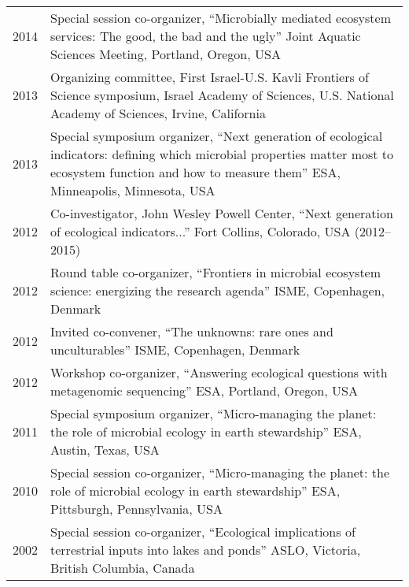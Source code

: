 \documentclass[11pt]{article}
\begin{document}
\begin{longtable}{@{}p{3em}@{\hspace{1.5em}}p{}@{}}
2014 & Special session co-organizer, “Microbially mediated ecosystem services: The good, the bad and the ugly” Joint Aquatic Sciences Meeting, Portland, Oregon, USA \\
2013 & Organizing committee, First Israel-U.S. Kavli Frontiers of Science symposium, Israel Academy of Sciences, U.S. National Academy of Sciences, Irvine, California \\
2013 & Special symposium organizer, “Next generation of ecological indicators: defining which microbial properties matter most to ecosystem function and how to measure them” ESA, Minneapolis, Minnesota, USA \\
2012 & Co-investigator, John Wesley Powell Center, “Next generation of ecological indicators...” Fort Collins, Colorado, USA (2012--2015) \\
2012 & Round table co-organizer, “Frontiers in microbial ecosystem science: energizing the research agenda” ISME, Copenhagen, Denmark \\
2012 & Invited co-convener, “The unknowns: rare ones and unculturables” ISME, Copenhagen, Denmark \\
2012 & Workshop co-organizer, “Answering ecological questions with metagenomic sequencing” ESA, Portland, Oregon, USA \\
2011 & Special symposium organizer, “Micro-managing the planet: the role of microbial ecology in earth stewardship” ESA, Austin, Texas, USA \\
2010 & Special session co-organizer, “Micro-managing the planet: the role of microbial ecology in earth stewardship” ESA, Pittsburgh, Pennsylvania, USA \\
2002 & Special session co-organizer, “Ecological implications of terrestrial inputs into lakes and ponds” ASLO, Victoria, British Columbia, Canada \\
\end{longtable}
\end{document}
